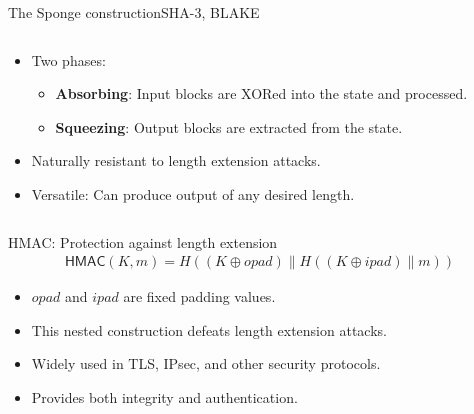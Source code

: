 \documentclass[aspectratio=169, lualatex, handout]{beamer}
\begin{document}
\begin{frame}{The Sponge construction}{SHA-3, BLAKE}
	\begin{columns}[c]
		\begin{column}{0.55\textwidth}
			\begin{itemize}[<+->]
				\item Two phases:
				      \begin{itemize}
					      \item \textbf{Absorbing}: Input blocks are XORed into the state and processed.
					      \item \textbf{Squeezing}: Output blocks are extracted from the state.
				      \end{itemize}
				\item Naturally resistant to length extension attacks.
				\item Versatile: Can produce output of any desired length.
			\end{itemize}
		\end{column}
		\begin{column}{0.45\textwidth}
		\end{column}
	\end{columns}
\end{frame}

\begin{frame}{HMAC: Protection against length extension}
	\begin{align*}
		\textsf{HMAC}(K, m) = H((K \oplus opad) \| H((K \oplus ipad) \| m))
	\end{align*}
	\begin{itemize}[<+->]
		\item $opad$ and $ipad$ are fixed padding values.
		\item This nested construction defeats length extension attacks.
		\item Widely used in TLS, IPsec, and other security protocols.
		\item Provides both integrity and authentication.
	\end{itemize}
\end{frame}
\end{document}
